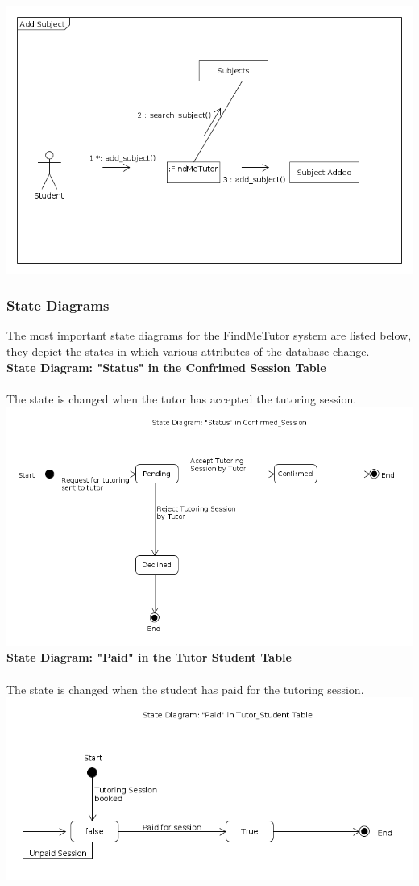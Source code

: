 \documentclass[12pt]{article}
\begin{document}
\includegraphics[width=140mm]{./communication_diagram/communication_diagram_as.png}
\newpage
\subsubsection{State Diagrams}
The most important state diagrams for the FindMeTutor system are listed below, they depict the states in which various attributes of the database change.\\

\textbf{State Diagram: "Status" in the Confrimed Session Table}\\\\
\text The state is changed when the tutor has accepted the tutoring session.
\includegraphics[width=140mm]{./state_diagram/statediagram_status.png}
\\
\textbf{State Diagram: "Paid" in the Tutor Student Table}\\\\
\text The state is changed when the student has paid for the tutoring session.
\includegraphics[width=140mm]{./state_diagram/statediagram_paid.png}
\end{document}
